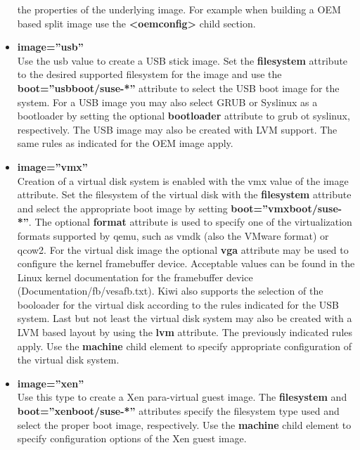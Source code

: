 \begin{itemize}
      the properties of the underlying image. For example when building a 
      OEM based split image use the \textbf{<oemconfig>} child section.
\item \textbf{image=''usb''}\\
      Use the usb value to create a USB stick image. Set the
      \textbf{filesystem} attribute to the desired supported filesystem for
      the image and use the \textbf{boot=''usbboot/suse-*''} attribute to
      select the USB boot image for the system. For a USB image you may
      also select GRUB or Syslinux as a bootloader by setting the
      optional \textbf{bootloader} attribute to grub ot syslinux,
      respectively. The USB image may also be created with LVM support.
      The same rules as indicated for the OEM image apply.
\item \textbf{image=''vmx''}\\
      Creation of a virtual disk system is enabled with the vmx value of
      the image attribute. Set the filesystem of the virtual disk with
      the \textbf{filesystem} attribute and select the appropriate boot
      image by setting \textbf{boot=''vmxboot/suse-*''}. The optional
      \textbf{format} attribute is used to specify one of the virtualization
      formats supported by qemu, such as vmdk (also the VMware format) or
      qcow2. For the virtual disk image the optional \textbf{vga} attribute
      may be used to configure the kernel framebuffer device. Acceptable
      values can be found in the Linux kernel documentation for the
      framebuffer device (Documentation/fb/vesafb.txt). Kiwi also supports
      the selection of the booloader for the virtual disk according to
      the rules indicated for the USB system. Last but not least
      the virtual disk system may also be created with a LVM based layout by
      using the \textbf{lvm} attribute. The previously indicated rules apply.
      Use the \textbf{machine} child element
      to specify appropriate configuration of the virtual disk system.
\item \textbf{image=''xen''}\\
      Use this type to create a Xen para-virtual guest image. The
      \textbf{filesystem} and \textbf{boot=''xenboot/suse-*''} attributes
      specify the filesystem type used and select the proper boot image,
      respectively. Use the \textbf{machine} child element to specify
      configuration options of the Xen guest image.
\end{itemize}

